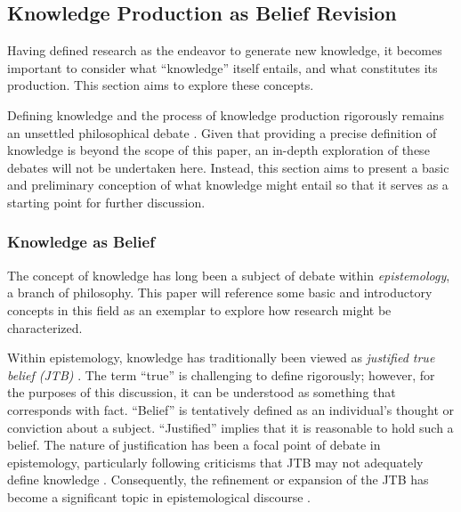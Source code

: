 \subsection{Knowledge Production as Belief Revision}
\label{section-knowledge-production-as-belief-revision}
Having defined research as the endeavor to generate new knowledge, it becomes important to consider what ``knowledge'' itself entails, and what constitutes its production. This section aims to explore these concepts.

Defining knowledge and the process of knowledge production rigorously remains an unsettled philosophical debate \cite{sep-epistemology}. Given that providing a precise definition of knowledge is beyond the scope of this paper, an in-depth exploration of these debates will not be undertaken here. Instead, this section aims to present a basic and preliminary conception of what knowledge might entail so that it serves as a starting point  for further discussion.



\subsubsection{Knowledge as Belief}
The concept of knowledge has long been a subject of debate within \textit{epistemology}, a branch of philosophy. This paper will reference some basic and introductory concepts in this field as an exemplar to explore how research might be characterized.

Within epistemology, knowledge has traditionally been viewed as \textit{justified true belief (JTB)} \cite{sep-epistemology}. The term ``true'' is challenging to define rigorously; however, for the purposes of this discussion, it can be understood as something that corresponds with fact. ``Belief'' is tentatively defined as an individual's thought or conviction about a subject. ``Justified'' implies that it is reasonable to hold such a belief. The nature of justification has been a focal point of debate in epistemology, particularly following criticisms that JTB may not adequately define knowledge \cite{gettier1963justified}. Consequently, the refinement or expansion of the JTB has become a significant topic in epistemological discourse \cite{sep-epistemology}.


